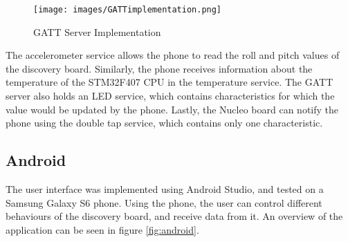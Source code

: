\documentclass[12pt]{article}
\begin{document}
\begin{figure}[!htb]
 \centering
 \texttt{[image: images/GATTimplementation.png]}
 \caption{GATT Server Implementation}
 \label{fig:gattimp}
\end{figure}

The accelerometer service allows the phone to read the roll and pitch values of the discovery board. Similarly, the phone receives information about the temperature of the STM32F407 CPU in the temperature service. The GATT server also holds an LED service, which contains characteristics for which the value would be updated by the phone. Lastly, the Nucleo board can notify the phone using the double tap service, which contains only one characteristic.

\subsection{Android}
The user interface was implemented using Android Studio, and tested on a Samsung Galaxy S6 phone. Using the phone, the user can control different behaviours of the discovery board, and receive data from it. An overview of the application can be seen in figure \ref{fig:android}.
\paragraph{}
\end{document}
